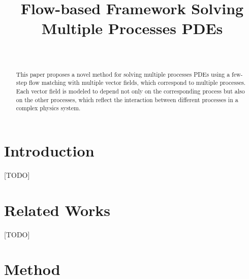 \documentclass{article}
\title{Flow-based Framework Solving Multiple Processes PDEs}
\author{%
   \\
}
\begin{document}
\maketitle


\begin{abstract}
  This paper proposes a novel method for solving multiple processes PDEs using a few-step flow matching with multiple vector fields, which correspond to multiple processes. Each vector field is modeled to depend not only on the corresponding process but also on the other processes, which reflect the interaction between different processes in a complex physics system.
\end{abstract}



\section{Introduction}
[TODO]
\section{Related Works}
[TODO]
\section{Method}
\end{document}
